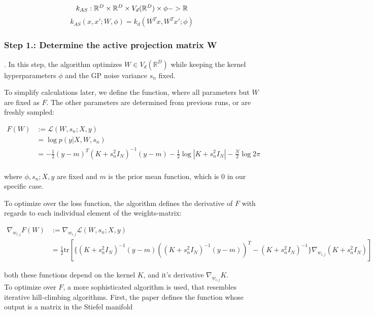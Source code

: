 \begin{equation}
k_{AS} : \mathbb{R}^D \times \mathbb{R}^D \times V_d(\mathbb{R}^D) \times \phi -> \mathbb{R} \\
\end{equation}
\begin{equation}
k_{AS} (x, x'; W, \phi) = k_d(W^T x, W^T x'; \phi)
\end{equation}


\subsubsection{Step 1.: Determine the active projection matrix W}.
In this step, the algorithm optimizes $W \in V_d(\mathbb{R}^D)$ while keeping the kernel hyperparameters $\phi$ and the GP noise variance $s_n$ fixed.

To simplify calculations later, we define the function, where all parameters but $W$ are fixed as $F$. 
The other parameters are determined from previous runs, or are freshly sampled:

\begin{align}
F(W) &:= \mathcal{L}(W, s_n; X, y) \\
& = \log p(y | X, W, s_n) \\
& =  -\frac{1}{2} (y - m)^T (K + s_n^2 I_N)^{-1} (y - m) -\frac{1}{2} \log|K + s_n^2 I_N| -\frac{N}{2} \log 2 \pi   \\
\end{align}

where $\phi, s_n; X, y$ are fixed and $m$ is the prior mean function, which is 0 in our specific case.

To optimize over the loss function, the algorithm defines the derivative of $F$ with regards to each individual element of the weights-matrix:

\begin{align}
\nabla_{w_{i,j}} F(W) &:= \nabla_{w_{i,j}} \mathcal{L}(W, s_n; X, y) \\
& = \frac{1}{2} \text{tr} \left[ \{ (K + s_n^2 I_N)^{-1} (y-m) \left( (K + s_n^2 I_N)^{-1} (y-m) \right)^T - (K + s_n^2 I_N)^{-1} \} \nabla_{w_{i,j}} (K + s_n^2 I_N) \right]
\end{align}

both these functions depend on the kernel $K$, and it's derivative $\nabla_{w_{i,j}} K$. \\

To optimize over $F$, a more sophisticated algorithm is used, that resembles iterative hill-climbing algorithms.
First, the paper defines the function whose output is a matrix in the Stiefel manifold

